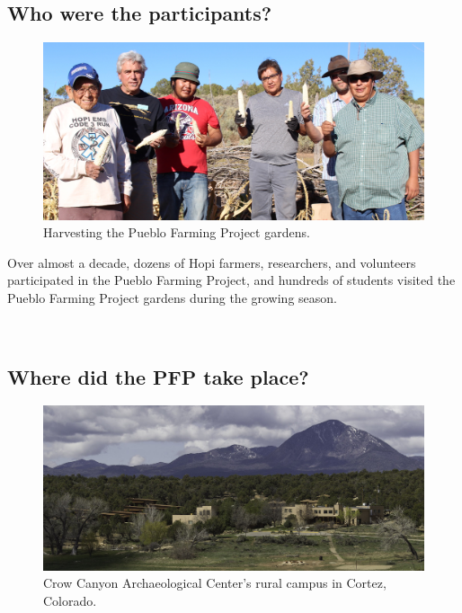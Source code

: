 \documentclass[12pt,]{article}
\begin{document}
\hypertarget{who-were-the-participants}{%
\subsection{Who were the participants?}\label{who-were-the-participants}}

\begin{figure}
\centering
\includegraphics{./images/section_1.2_header.jpg}
\caption{Harvesting the Pueblo Farming Project gardens.}
\end{figure}

Over almost a decade, dozens of Hopi farmers, researchers, and volunteers participated in the Pueblo Farming Project, and hundreds of students visited the Pueblo Farming Project gardens during the growing season.

~

\hypertarget{where-did-the-pfp-take-place}{%
\subsection{Where did the PFP take place?}\label{where-did-the-pfp-take-place}}

\begin{figure}
\centering
\includegraphics{./images/section_1.3_header.jpg}
\caption{Crow Canyon Archaeological Center's rural campus in Cortez, Colorado.}
\end{figure}
\end{document}
